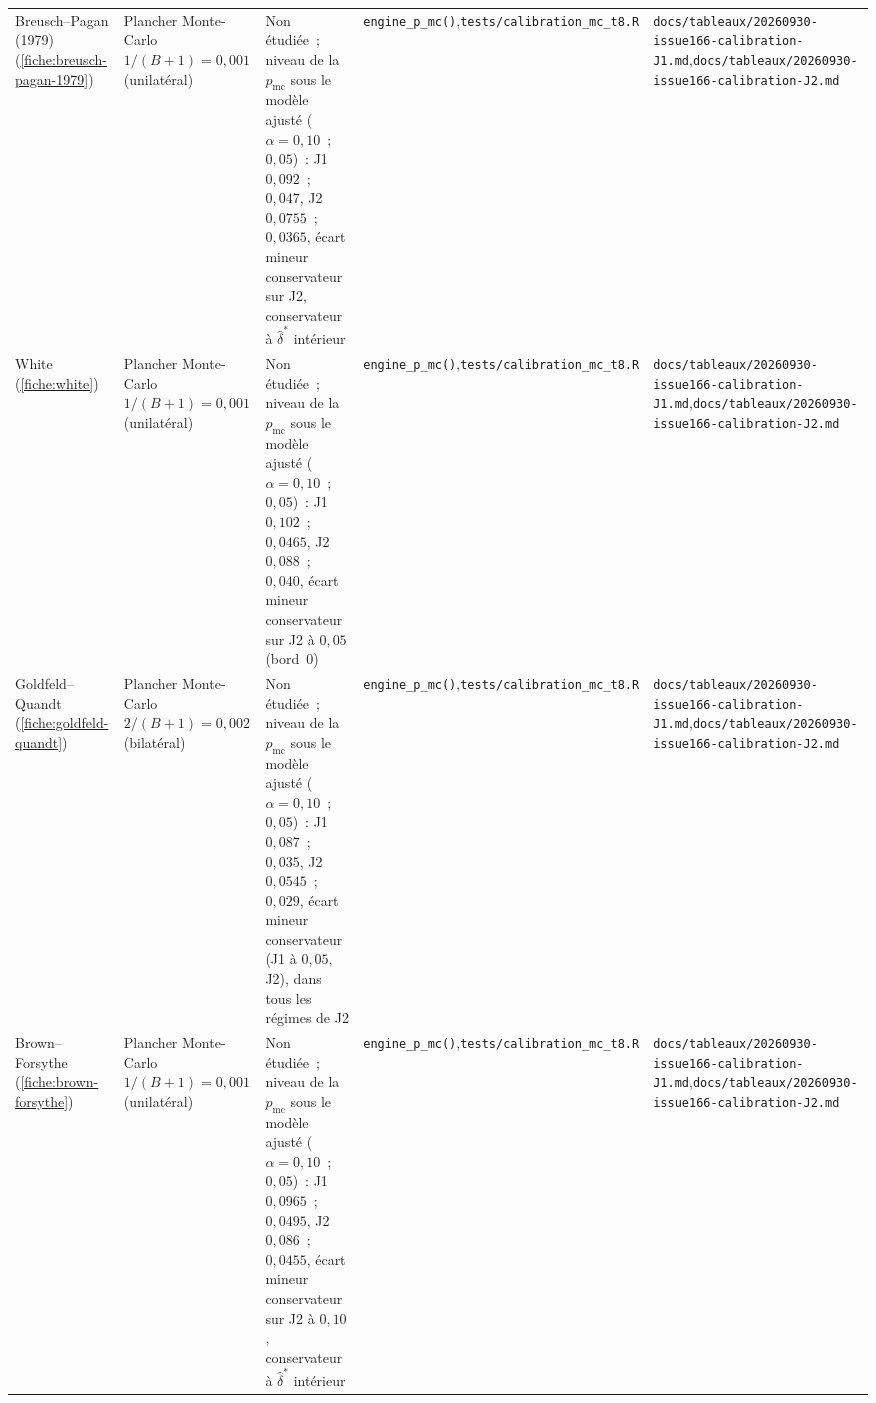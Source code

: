 \documentclass[a4paper,11pt]{article}
\newcommand{\code}[1]{\texttt{\small #1}}
\begin{document}
\begin{landscape}
\begin{center}
\begin{longtable}{@{}>{\raggedright\arraybackslash}p{2.5cm}>{\raggedright\arraybackslash}p{3.6cm}>{\raggedright\arraybackslash}p{4.0cm}>{\raggedright\arraybackslash}p{6.7cm}>{\raggedright\arraybackslash}p{7.2cm}@{}}
Breusch--Pagan (1979) (\ref{fiche:breusch-pagan-1979}) & Plancher Monte-Carlo $1/(B+1) = 0{,}001$ (unilatéral) & Non étudiée~; niveau de la $p_{\mathrm{mc}}$ sous le modèle ajusté ($\alpha = 0{,}10$~; $0{,}05$)~: J1 $0{,}092$~; $0{,}047$, J2 $0{,}0755$~; $0{,}0365$, écart mineur conservateur sur J2, conservateur à $\hat\delta^{*}$ intérieur & \code{engine\_p\_mc()},\newline \code{tests/calibration\_mc\_t8.R} & \code{docs/tableaux/}\newline \code{20260930-issue166-calibration-J1.md},\newline \code{docs/tableaux/}\newline \code{20260930-issue166-calibration-J2.md} \\
White (\ref{fiche:white}) & Plancher Monte-Carlo $1/(B+1) = 0{,}001$ (unilatéral) & Non étudiée~; niveau de la $p_{\mathrm{mc}}$ sous le modèle ajusté ($\alpha = 0{,}10$~; $0{,}05$)~: J1 $0{,}102$~; $0{,}0465$, J2 $0{,}088$~; $0{,}040$, écart mineur conservateur sur J2 à $0{,}05$ (bord~0) & \code{engine\_p\_mc()},\newline \code{tests/calibration\_mc\_t8.R} & \code{docs/tableaux/}\newline \code{20260930-issue166-calibration-J1.md},\newline \code{docs/tableaux/}\newline \code{20260930-issue166-calibration-J2.md} \\
Goldfeld--Quandt (\ref{fiche:goldfeld-quandt}) & Plancher Monte-Carlo $2/(B+1) = 0{,}002$ (bilatéral) & Non étudiée~; niveau de la $p_{\mathrm{mc}}$ sous le modèle ajusté ($\alpha = 0{,}10$~; $0{,}05$)~: J1 $0{,}087$~; $0{,}035$, J2 $0{,}0545$~; $0{,}029$, écart mineur conservateur (J1 à $0{,}05$, J2), dans tous les régimes de J2 & \code{engine\_p\_mc()},\newline \code{tests/calibration\_mc\_t8.R} & \code{docs/tableaux/}\newline \code{20260930-issue166-calibration-J1.md},\newline \code{docs/tableaux/}\newline \code{20260930-issue166-calibration-J2.md} \\
Brown--Forsythe (\ref{fiche:brown-forsythe}) & Plancher Monte-Carlo $1/(B+1) = 0{,}001$ (unilatéral) & Non étudiée~; niveau de la $p_{\mathrm{mc}}$ sous le modèle ajusté ($\alpha = 0{,}10$~; $0{,}05$)~: J1 $0{,}0965$~; $0{,}0495$, J2 $0{,}086$~; $0{,}0455$, écart mineur conservateur sur J2 à $0{,}10$, conservateur à $\hat\delta^{*}$ intérieur & \code{engine\_p\_mc()},\newline \code{tests/calibration\_mc\_t8.R} & \code{docs/tableaux/}\newline \code{20260930-issue166-calibration-J1.md},\newline \code{docs/tableaux/}\newline \code{20260930-issue166-calibration-J2.md} \\

\end{longtable}
\end{center}
\end{landscape}
\end{document}
